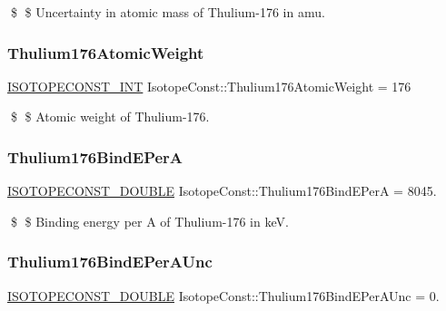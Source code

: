 \$ \$ Uncertainty in atomic mass of Thulium-\/176 in amu. \mbox{\label{group___isotope_const-_thulium-_tm176_ga98bfb416e4308192d02c908471e7030b}} 
\subsubsection{\texorpdfstring{Thulium176\+Atomic\+Weight}{Thulium176AtomicWeight}}
{\footnotesize\ttfamily \mbox{\hyperlink{group___isotope_const-_macros_ga5f18360b3e99483a35c32d789e62621c}{I\+S\+O\+T\+O\+P\+E\+C\+O\+N\+S\+T\+\_\+\+I\+NT}} Isotope\+Const\+::\+Thulium176\+Atomic\+Weight = 176}

\$ \$ Atomic weight of Thulium-\/176. \mbox{\label{group___isotope_const-_thulium-_tm176_gac1cffcb1db956fda105a1c0c94e93b5d}} 
\subsubsection{\texorpdfstring{Thulium176\+Bind\+E\+PerA}{Thulium176BindEPerA}}
{\footnotesize\ttfamily \mbox{\hyperlink{group___isotope_const-_macros_ga8f45a7272ce02c0b4c65c44636ed719a}{I\+S\+O\+T\+O\+P\+E\+C\+O\+N\+S\+T\+\_\+\+D\+O\+U\+B\+LE}} Isotope\+Const\+::\+Thulium176\+Bind\+E\+PerA = 8045.}

\$ \$ Binding energy per A of Thulium-\/176 in keV. \mbox{\label{group___isotope_const-_thulium-_tm176_ga9018c156e5119747ccc7d616d84663b7}} 
\subsubsection{\texorpdfstring{Thulium176\+Bind\+E\+Per\+A\+Unc}{Thulium176BindEPerAUnc}}
{\footnotesize\ttfamily \mbox{\hyperlink{group___isotope_const-_macros_ga8f45a7272ce02c0b4c65c44636ed719a}{I\+S\+O\+T\+O\+P\+E\+C\+O\+N\+S\+T\+\_\+\+D\+O\+U\+B\+LE}} Isotope\+Const\+::\+Thulium176\+Bind\+E\+Per\+A\+Unc = 0.}

